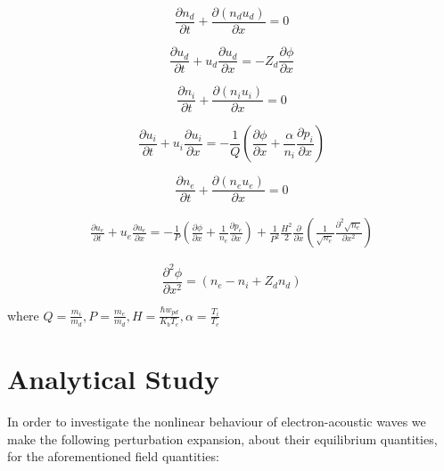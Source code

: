 \documentclass[journal]{IEEEtran}
\begin{document}
			\begin{equation}
				\frac{\partial n_d}{\partial t} + \frac{\partial (n_du_d)}{\partial x} = 0	
			\end{equation}
		
			\begin{equation}
				\frac{\partial u_d}{\partial t} + u_d \frac{\partial u_d}{\partial x} = -Z_d\frac{\partial \phi}{\partial x}
			\end{equation}			 
	
			\begin{equation}
				\frac{\partial n_i}{\partial t} + \frac{\partial (n_iu_i)}{\partial x} = 0		
			\end{equation}
		
			\begin{equation}
				\frac{\partial u_i}{\partial t} + u_i \frac{\partial 	u_i}{\partial x} = -\frac{1}{Q}( \frac{\partial \phi}{\partial x} + \frac{\alpha}{n_i} \frac{\partial p_i}{\partial x})
			\end{equation}

			\begin{equation}
				\frac{\partial n_e}{\partial t} + \frac{\partial (n_eu_e)}{\partial x} = 0
			\end{equation}
		
			\begin{equation}
				\begin{split}
					\frac{\partial u_e}{\partial t} + u_e \frac{\partial u_e}{\partial x} = -\frac{1}{P}(\frac{\partial \phi}{\partial x} + \frac{1}{n_e} \frac{\partial p_e}{\partial x})  + \frac{1}{P^2}\frac{H^2}{2} \frac{\partial}{\partial x} (\frac{1}				{\sqrt{n_e}}\frac{\partial^2 \sqrt{n_e}}{\partial x^2})
				\end{split}
			\end{equation}
	
			\begin{equation}
				\frac{\partial^2 \phi}{\partial x^2} = (n_e - n_i + Z_dn_d)
			\end{equation}
		
			where $Q = \frac{m_i}{m_d}, P = \frac{m_e}{m_d}, H = \frac{\hbar w_{pd}}{K_bT_e}, \alpha = \frac{T_i}{T_e}$

\section{Analytical Study}
	In order to investigate the nonlinear behaviour of electron-acoustic waves we make the following perturbation expansion, about their equilibrium quantities, for the aforementioned field quantities:
	
\end{document}
